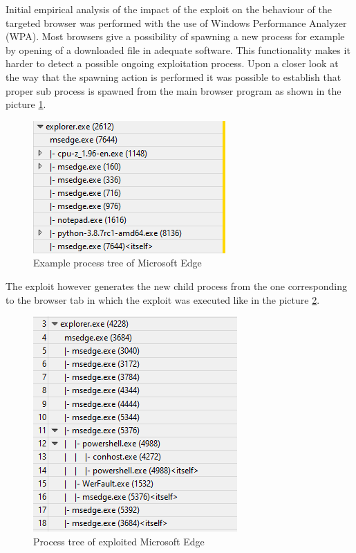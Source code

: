 \documentclass[a4paper,twoside,12pt]{book}
\begin{document}
Initial empirical analysis of the impact of the exploit on the behaviour of the targeted browser was 
performed with the use of Windows Performance Analyzer (WPA).  Most browsers give a 
possibility of spawning a new process for example by opening of a downloaded file in 
adequate software. This functionality makes it harder to detect a possible ongoing exploitation process. 
Upon a closer look at the way that the spawning action is performed it was possible to establish that proper 
sub process is spawned from the main browser program as shown in the picture \ref{fig:WPAnormal}.

\begin{figure}
	\centering
	\includegraphics{images/wpa_normal}
	\caption{Example process tree of Microsoft Edge}
	\label{fig:WPAnormal}
 \end{figure}

The exploit however generates the new child process from the one corresponding to the browser tab 
in which the exploit was executed like in the picture \ref{fig:WPAexploit}. 

\begin{figure}
	\centering
	\includegraphics{images/wpa_exploit}
	\caption{Process tree of exploited Microsoft Edge}
	\label{fig:WPAexploit}
 \end{figure}
\end{document}
